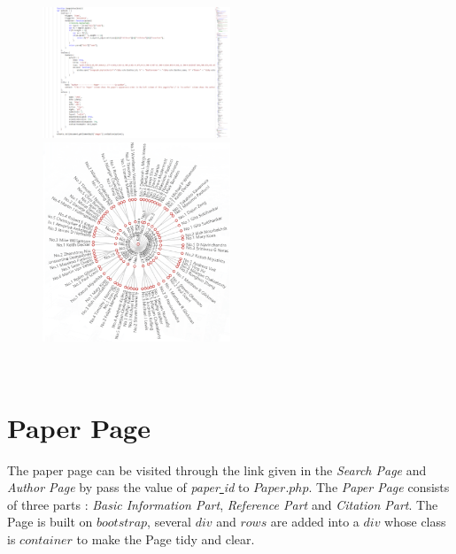 \documentclass{article}
\begin{document}
\begin{figure}[!h]
		\includegraphics[width=0.5\textwidth]{treegraphcode2.png}
		\includegraphics[width=0.5\textwidth]{treegraphimage.png}
	\end{figure}\
	\restoregeometry
	\newpage
	\section{Paper Page}
	The paper page can be visited through the link given in the \emph{Search Page} and \emph{Author Page} by pass the value of \emph{paper\underline{ }id} to \(Paper.php\). The \emph{Paper Page} consists of three parts : \emph{Basic Information Part}, \emph{Reference Part} and \emph{Citation Part}. The Page is built on \(bootstrap\), several \(div\) and \(rows\) are added into a \(div\) whose class is
	\(container\) to make the Page tidy and clear.
\end{document}
